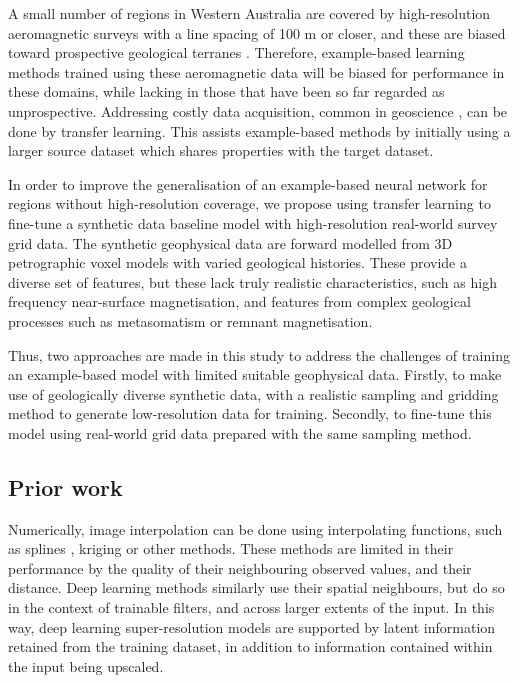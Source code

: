 A small number of regions in Western Australia are covered by high-resolution aeromagnetic surveys with a line spacing of 100 m or closer, and these are biased toward prospective geological terranes \parencite{howardAirborneGeophysicalCoverage2004}.
Therefore, example-based learning methods trained using these aeromagnetic data will be biased for performance in these domains, while lacking in those that have been so far regarded as unprospective.
Addressing costly data acquisition, common in geoscience \parencite{dawsonImpactDatasetSize2023}, can be done by transfer learning.
This assists example-based methods by initially using a larger source dataset which shares properties with the target dataset.

In order to improve the generalisation of an example-based neural network for regions without high-resolution coverage, we propose using transfer learning \parencite{tanSurveyDeepTransfer2018} to fine-tune a synthetic data baseline model with high-resolution real-world survey grid data.
The synthetic geophysical data \parencite{jessellNoddyverseMassiveData2022} are forward modelled from 3D petrographic voxel models with varied geological histories.
These provide a diverse set of features, but these lack truly realistic characteristics, such as high frequency near-surface magnetisation, and features from complex geological processes such as metasomatism or remnant magnetisation.

Thus, two approaches are made in this study to address the challenges of training an example-based model with limited suitable geophysical data.
Firstly, to make use of geologically diverse synthetic data, with a realistic sampling and gridding method to generate low-resolution data for training.
Secondly, to fine-tune this model using real-world grid data prepared with the same sampling method.

\subsection{Prior work}
Numerically, image interpolation can be done using interpolating functions, such as splines \parencite{keysCubicConvolutionInterpolation1981}, kriging \parencite{hansenInterpretiveGriddingAnisotropic1993} or other methods.
These methods are limited in their performance by the quality of their neighbouring observed values, and their distance.
Deep learning methods similarly use their spatial neighbours, but do so in the context of trainable filters, and across larger extents of the input.
In this way, deep learning super-resolution models are supported by latent information retained from the training dataset, in addition to information contained within the input being upscaled.

